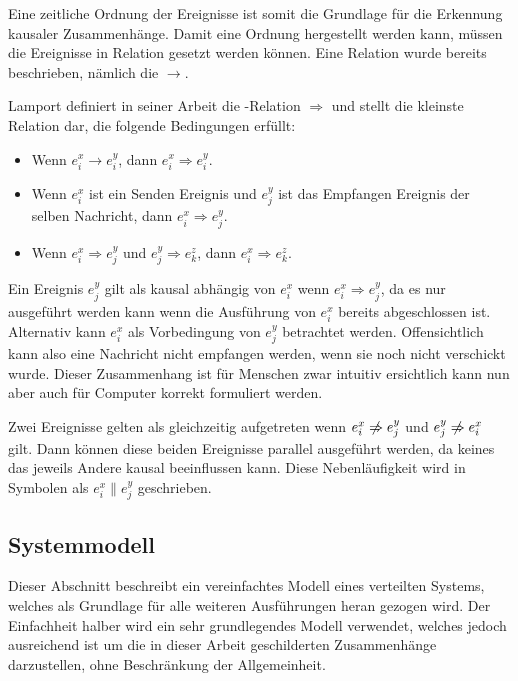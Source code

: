 Eine zeitliche Ordnung der Ereignisse ist somit die Grundlage für die Erkennung kausaler Zusammenhänge.
Damit eine Ordnung hergestellt werden kann, müssen die Ereignisse in Relation gesetzt werden können.
Eine Relation wurde bereits beschrieben, nämlich die  $\rightarrow$.

Lamport \cite{Lamport1978} definiert in seiner Arbeit die -Relation $\Rightarrow$ und stellt die kleinste Relation dar, die folgende Bedingungen erfüllt:
\begin{itemize}
    \item Wenn $e_i^x \rightarrow e_i^y$, dann $e_i^x \Rightarrow e_i^y$.
    \item Wenn $e_i^x$ ist ein Senden Ereignis und $e_j^y$ ist das Empfangen Ereignis der selben Nachricht, dann $e_i^x \Rightarrow e_j^y$.
    \item Wenn $e_i^x \Rightarrow e_j^y$ und $e_j^y \Rightarrow e_k^z$, dann $e_i^x \Rightarrow e_k^z$.
\end{itemize}

Ein Ereignis $e_j^y$ gilt als kausal abhängig von $e_i^x$ wenn $e_i^x \Rightarrow e_j^y$, da es nur ausgeführt werden kann wenn die Ausführung von $e_i^x$ bereits abgeschlossen ist.
Alternativ kann $e_i^x$ als Vorbedingung von $e_j^y$ betrachtet werden.
Offensichtlich kann also eine Nachricht nicht empfangen werden, wenn sie noch nicht verschickt wurde.
Dieser Zusammenhang ist für Menschen zwar intuitiv ersichtlich kann nun aber auch für Computer korrekt formuliert werden.

Zwei Ereignisse gelten als gleichzeitig aufgetreten wenn $e_i^x \centernot\Rightarrow e_j^y$ und $e_j^y \centernot\Rightarrow e_i^x$ gilt.
Dann können diese beiden Ereignisse parallel ausgeführt werden, da keines das jeweils Andere kausal beeinflussen kann.
Diese Nebenläufigkeit wird in Symbolen als $e_i^x \parallel e_j^y$ geschrieben.



\subsection{Systemmodell}
Dieser Abschnitt beschreibt ein vereinfachtes Modell eines verteilten Systems, welches als Grundlage für alle weiteren Ausführungen heran gezogen wird.
Der Einfachheit halber wird ein sehr grundlegendes Modell verwendet, welches jedoch ausreichend ist um die in dieser Arbeit geschilderten Zusammenhänge darzustellen, ohne Beschränkung der Allgemeinheit.

